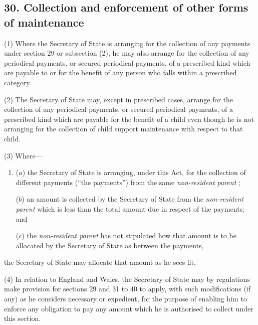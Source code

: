 \documentclass[12pt,a4paper]{article}
\begin{document}

\subsection{30. Collection and enforcement of other forms of maintenance}

(1) Where the Secretary of State is arranging for the collection of any payments under section 29 or subsection (2), he may also arrange for the collection of any periodical payments, or secured periodical payments, of a prescribed kind which are payable to or for the benefit of any person who falls within a prescribed category.


(2) The Secretary of State may, except in prescribed cases, arrange for the collection of any periodical payments, or secured periodical payments, of a prescribed kind which are payable for the benefit of a child even though he is not arranging for the collection of child support maintenance with respect to that child.

(3) Where—
\begin{enumerate}\item[]
($a$) the Secretary of State is arranging, under this Act, for the collection of different payments (“the payments”) from the same 
\emph{non-resident parent}%
;

($b$) an amount is collected by the Secretary of State from the 
\emph{non-resident parent}  %
which is less than the total amount due in respect of the payments; and

($c$) the 
\emph{non-resident parent}  %
has not stipulated how that amount is to be allocated by the Secretary of State as between the payments,
\end{enumerate}
the Secretary of State may allocate that amount as he sees fit.

(4) In relation to England and Wales, the Secretary of State may by regulations make provision for sections 29 and 31 to 40 to apply, with such modifications (if any) as he considers necessary or expedient, for the purpose of enabling him to enforce any obligation to pay any amount which he is authorised to collect under this section.
\end{document}
